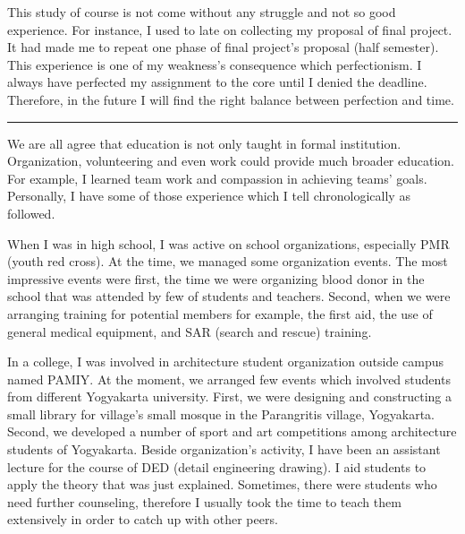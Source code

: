\documentclass[11pt]{simart} %
\begin{document}
This study of course is not come without any struggle and not so good experience. For instance, I used to late on collecting my proposal of final project. It had made me to repeat one phase of final project's proposal (half semester). This experience is one of my weakness's consequence which perfectionism. I always have perfected my assignment to the core until I denied the deadline. Therefore, in the future I will find the right balance between perfection and time.

\noindent\rule{\linewidth}{0.5pt}
We are all agree that education is not only taught in formal institution. Organization, volunteering and even work could provide much broader education. For example, I learned team work and compassion in achieving teams' goals. Personally, I have some of those experience which I tell chronologically as followed.

When I was in high school, I was active on school organizations, especially PMR (youth red cross). At the time, we managed some organization events. The most impressive events were first, the time we were organizing blood donor in the school that was attended by few of students and teachers. Second, when we were arranging training for potential members for example, the first aid, the use of general medical equipment, and SAR (search and rescue) training.

In a college, I was involved in architecture student organization outside campus named PAMIY. At the moment, we arranged few events which involved students from different Yogyakarta university. First, we were designing and constructing a small library for village's small mosque in the Parangritis village, Yogyakarta. Second, we developed a number of sport and art competitions among architecture students of Yogyakarta. Beside organization's activity, I have been an assistant lecture for the course of DED (detail engineering drawing). I aid students to apply the theory that was just explained. Sometimes, there were  students who need further counseling, therefore I usually took the time to teach them extensively in order to catch up with other peers.
\end{document}
